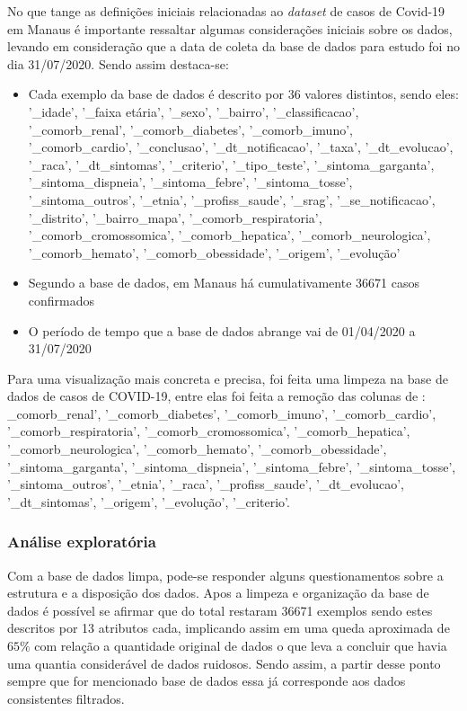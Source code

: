 No que tange as definições iniciais relacionadas ao \textit{dataset} de casos de Covid-19 em Manaus é importante ressaltar algumas considerações iniciais sobre os dados, levando em consideração que a data de coleta da base de dados para estudo foi no dia 31/07/2020. Sendo assim destaca-se:

\begin{itemize}
    \item Cada exemplo da base de dados é descrito por 36 valores distintos, sendo eles: '\_idade',
    '\_faixa etária', '\_sexo', '\_bairro', '\_classificacao', '\_comorb\_renal', '\_comorb\_diabetes',
    '\_comorb\_imuno', '\_comorb\_cardio', '\_conclusao', '\_dt\_notificacao', '\_taxa',
    '\_dt\_evolucao',
    '\_raca', '\_dt\_sintomas', '\_criterio', '\_tipo\_teste', '\_sintoma\_garganta',
    '\_sintoma\_dispneia',
    '\_sintoma\_febre', '\_sintoma\_tosse', '\_sintoma\_outros', '\_etnia', '\_profiss\_saude',
    '\_srag',
    '\_se\_notificacao', '\_distrito', '\_bairro\_mapa', '\_comorb\_respiratoria',
    '\_comorb\_cromossomica',
    '\_comorb\_hepatica', '\_comorb\_neurologica', '\_comorb\_hemato', '\_comorb\_obessidade',
    '\_origem', '\_evolução'
    \item Segundo a base de dados, em Manaus há cumulativamente 36671 casos confirmados
    \item O período de tempo que a base de dados abrange vai de 01/04/2020 a 31/07/2020
\end{itemize}

Para uma visualização mais concreta e precisa, foi feita uma limpeza na base de dados de casos de COVID-19, entre elas foi feita a remoção das colunas de : \_comorb\_renal', '\_comorb\_diabetes', '\_comorb\_imuno', 
'\_comorb\_cardio', '\_comorb\_respiratoria', '\_comorb\_cromossomica', 
'\_comorb\_hepatica', '\_comorb\_neurologica', '\_comorb\_hemato', '\_comorb\_obessidade', '\_sintoma\_garganta', '\_sintoma\_dispneia', '\_sintoma\_febre', '\_sintoma\_tosse', '\_sintoma\_outros', '\_etnia', '\_raca', '\_profiss\_saude', '\_dt\_evolucao', '\_dt\_sintomas', '\_origem', '\_evolução', '\_criterio'.

\subsubsection{Análise exploratória}
Com a base de dados limpa, pode-se responder alguns questionamentos sobre a estrutura e a disposição dos dados. Apos a limpeza e organização da base de dados é possível se afirmar que do total restaram 36671 exemplos sendo estes descritos por 13 atributos cada, implicando assim em uma queda aproximada de $65\%$ com relação a quantidade original de dados o que leva a concluir que havia uma quantia considerável de dados ruidosos. Sendo assim, a partir desse ponto sempre que for mencionado base de dados essa já corresponde aos dados consistentes filtrados. 

